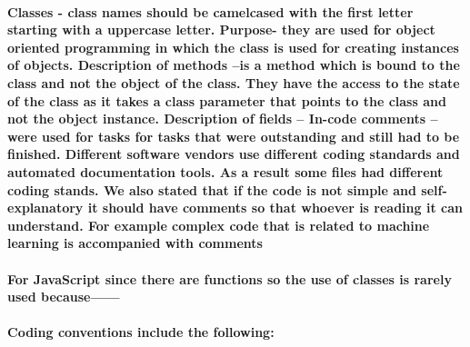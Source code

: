 \documentclass[10pt]{article}
\begin{document}
	    \paragraph{
	    \newline
	    Classes - class names should be camelcased with the first letter starting with a uppercase letter.
	    \newline
            Purpose- they are used for object oriented programming in which the class is used for creating instances of objects.
            \newline
            Description of methods –is a method which is bound to the class and not the object of the class. They have the access to the state of the class as it takes a class parameter that points to the class and not the object instance. 
            \newline
            Description of fields – 
            \newline
            In-code comments – were used for tasks for tasks that were outstanding and still had to be finished. Different software vendors use different coding standards and automated documentation tools. As a result some files had different coding stands.
            \newline
            We also stated that if the code is not simple and self-explanatory it should have comments so that whoever is reading it can understand. For example complex code that is related to machine learning is accompanied with comments
	    }
         \paragraph{
        For JavaScript since there are functions so the use of classes is rarely used because------
        }
    	\paragraph{
    	Coding conventions include the following:}
\end{document}
